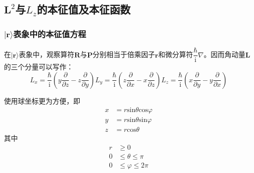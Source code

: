 \documentclass[]{article}
\begin{document}
\subsection{$\boldsymbol{L}^2$与$L_z$的本征值及本征函数}
\subsubsection{${|\boldsymbol{r}\rangle}$表象中的本征值方程}
在${|\boldsymbol{r}\rangle}$表象中，观察算符$\boldsymbol{R}$与$\boldsymbol{P}$分别相当于倍乘因子$\boldsymbol{r}$和微分算符$\dfrac{\hbar}{\mathrm{i}}\nabla$。因而角动量$\boldsymbol{L}$的三个分量可以写作：
\begin{subequations}
	\begin{equation}
		L_x=\dfrac{\hbar}{\mathrm{i}}\left( y\dfrac{\partial}{\partial z}-z\dfrac{\partial}{\partial y}\right) 
	\end{equation}
	\begin{equation}
		L_y=\dfrac{\hbar}{\mathrm{i}}\left( z\dfrac{\partial}{\partial x}-x\dfrac{\partial}{\partial z}\right) 
	\end{equation}
	\begin{equation}
		L_z=\dfrac{\hbar}{\mathrm{i}}\left( 	x\dfrac{\partial}{\partial y}-y\dfrac{\partial}{\partial x}\right) 
	\end{equation}
\label{d1d1}
\end{subequations}

使用球坐标更为方便，即
\begin{align}
	x&=r\mathrm{sin}\theta\mathrm{cos}\varphi\nonumber\\
	y&=r\mathrm{sin}\theta\mathrm{sin}\varphi\nonumber\\
	z&=r\mathrm{cos}\theta
\end{align}
其中
\begin{align}
	r&\geqslant0\nonumber\\
	0&\leqslant\theta\leqslant\pi\nonumber\\
	0&\leqslant\varphi\leqslant2\pi
\end{align}
\end{document}
